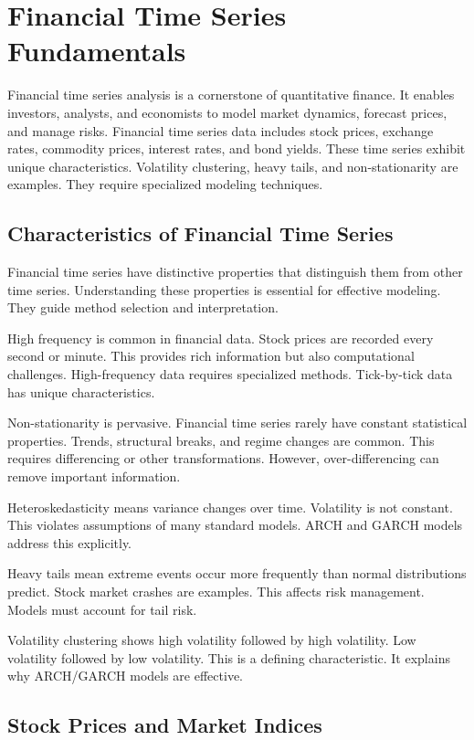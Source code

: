 \section{Financial Time Series Fundamentals}

Financial time series analysis is a cornerstone of quantitative finance. It enables investors, analysts, and economists to model market dynamics, forecast prices, and manage risks. Financial time series data includes stock prices, exchange rates, commodity prices, interest rates, and bond yields. These time series exhibit unique characteristics. Volatility clustering, heavy tails, and non-stationarity are examples. They require specialized modeling techniques.

\subsection{Characteristics of Financial Time Series}

Financial time series have distinctive properties that distinguish them from other time series. Understanding these properties is essential for effective modeling. They guide method selection and interpretation.

High frequency is common in financial data. Stock prices are recorded every second or minute. This provides rich information but also computational challenges. High-frequency data requires specialized methods. Tick-by-tick data has unique characteristics.

Non-stationarity is pervasive. Financial time series rarely have constant statistical properties. Trends, structural breaks, and regime changes are common. This requires differencing or other transformations. However, over-differencing can remove important information.

Heteroskedasticity means variance changes over time. Volatility is not constant. This violates assumptions of many standard models. ARCH and GARCH models address this explicitly.

Heavy tails mean extreme events occur more frequently than normal distributions predict. Stock market crashes are examples. This affects risk management. Models must account for tail risk.

Volatility clustering shows high volatility followed by high volatility. Low volatility followed by low volatility. This is a defining characteristic. It explains why ARCH/GARCH models are effective.

\subsection{Stock Prices and Market Indices}

